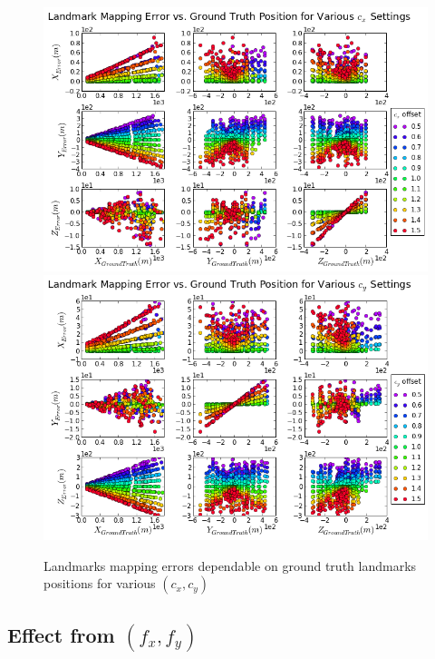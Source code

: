 \begin{figure}[h]
  \centering
  \includegraphics[width=13cm, keepaspectratio=true]{./Figures/SimulationFigures/Figure32.png}
  \includegraphics[width=13cm, keepaspectratio=true]{./Figures/SimulationFigures/Figure33.png}
  \caption{Landmarks mapping errors dependable on ground truth
    landmarks positions for various $(c_x, c_y)$}
  \label{fig:simfig32-33}
\end{figure}
\FloatBarrier

\subsection{Effect from $(f_x, f_y)$}

